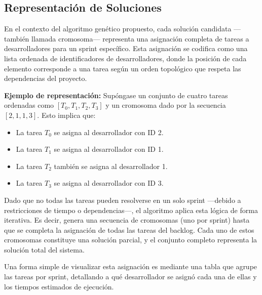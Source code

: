 \subsection{Representación de Soluciones}

En el contexto del algoritmo genético propuesto, cada solución candidata —también llamada cromosoma— representa una asignación completa de tareas a desarrolladores para un sprint específico. Esta asignación se codifica como una lista ordenada de identificadores de desarrolladores, donde la posición de cada elemento corresponde a una tarea según un orden topológico que respeta las dependencias del proyecto.

\textbf{Ejemplo de representación:}
Supóngase un conjunto de cuatro tareas ordenadas como $[T_0, T_1, T_2, T_3]$ y un cromosoma dado por la secuencia $[2, 1, 1, 3]$. Esto implica que:
\begin{itemize}
    \item La tarea $T_0$ se asigna al desarrollador con ID 2.
    \item La tarea $T_1$ se asigna al desarrollador con ID 1.
    \item La tarea $T_2$ también se asigna al desarrollador 1.
    \item La tarea $T_3$ se asigna al desarrollador con ID 3.
\end{itemize}

Dado que no todas las tareas pueden resolverse en un solo sprint —debido a restricciones de tiempo o dependencias—, el algoritmo aplica esta lógica de forma iterativa. Es decir, genera una secuencia de cromosomas (uno por sprint) hasta que se completa la asignación de todas las tareas del backlog. Cada uno de estos cromosomas constituye una solución parcial, y el conjunto completo representa la solución total del sistema.

Una forma simple de visualizar esta asignación es mediante una tabla que agrupe las tareas por sprint, detallando a qué desarrollador se asignó cada una de ellas y los tiempos estimados de ejecución.

